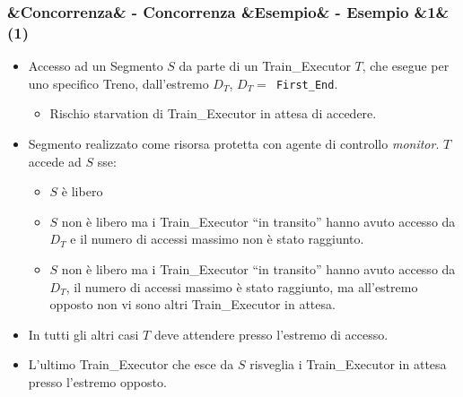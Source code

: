\documentclass[slidestop,compress,blackandwhite]{beamer}
\newcommand{\ttt}[1]{\texttt{#1}}
\newcommand{\ii}[1]{\textit{#1}}
\newcommand{\cm}[1]{\vspace{#1cm}}
\newcommand{\newtitle}[4]{
	#1 
	\ifx&#2&%
	\else
  		\large- #2
	\fi
	\ifx&#3&%
	\else
  		\normalsize- #3
	\fi
	\ifx&#4&%
	\else
  		\normalsize (#4)
	\fi
}
\newcommand{\newframe}[5]{
	\begin{frame}
		\frametitle{\newtitle{#1}{#2}{#3}{#4}}
		#5
	\end{frame}
}
\newcommand{\myitemize}[1]{
	\begin{itemize}\itemsep4pt
	#1
	\end{itemize}
}
\begin{document}
	\newframe{}{Concorrenza}{Esempio}{1}{
		\cm{-0.1}
		\footnotesize
		\myitemize {
			\item Accesso ad un Segmento $S$ da parte di un Train\_Executor $T$, che esegue per uno specifico Treno, dall'estremo $D_T$, $D_T=$\ttt{ First\_End}.
				\myitemize {
					\item \footnotesize Rischio starvation di Train\_Executor in attesa di accedere.
				}
			\item Segmento realizzato come risorsa protetta con agente di controllo \ii{monitor}. $T$ accede ad $S$ sse:
				\myitemize{
					\item \footnotesize $S$ è libero
					\item $S$ non è libero ma i Train\_Executor ``in transito'' hanno avuto accesso da $D_T$ e il numero di accessi massimo non è stato raggiunto.
					\item $S$ non è libero ma i Train\_Executor ``in transito'' hanno avuto accesso da $D_T$, il numero di accessi massimo è stato raggiunto, ma all'estremo opposto non vi sono altri Train\_Executor in attesa.
				}
			\item In tutti gli altri casi $T$ deve attendere presso l'estremo di accesso.
			\item L'ultimo Train\_Executor che esce da $S$ risveglia i Train\_Executor in attesa presso l'estremo opposto.
		}	
	}
	
\end{document}
